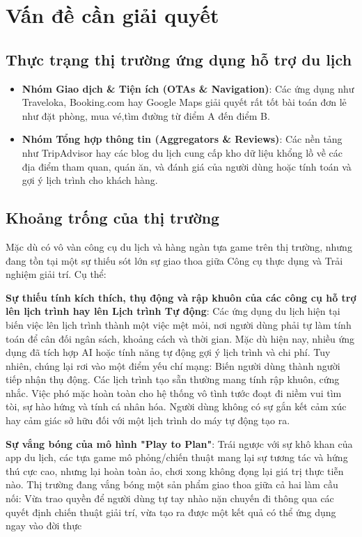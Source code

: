\newpage

\chapter{Vấn đề cần giải quyết}

\section{Thực trạng thị trường ứng dụng hỗ trợ du lịch}

\begin{itemize}[topsep=0pt, itemsep=2.5pt, leftmargin=1.5cm]
    \item \textbf{Nhóm Giao dịch \& Tiện ích (OTAs \& Navigation)}: Các ứng dụng như Traveloka, Booking.com hay Google Maps giải quyết rất tốt bài toán đơn lẻ như đặt phòng, mua vé,tìm đường từ điểm A đến điểm B.

    \item \textbf{Nhóm Tổng hợp thông tin (Aggregators \& Reviews)}: Các nền tảng như TripAdvisor hay các blog du lịch cung cấp kho dữ liệu khổng lồ về các địa điểm tham quan, quán ăn, và đánh giá của người dùng hoặc tính toán và gợi ý lịch trình cho khách hàng.
\end{itemize}

\section{Khoảng trống của thị trường}

Mặc dù có vô vàn công cụ du lịch và hàng ngàn tựa game trên thị trường, nhưng đang tồn tại một sự thiếu sót lớn sự giao thoa giữa Công cụ thực dụng và Trải nghiệm giải trí. Cụ thể:

\textbf{Sự thiếu tính kích thích, thụ động và rập khuôn của các công cụ hỗ trợ lên lịch trình hay lên Lịch trình Tự động}: Các ứng dụng du lịch hiện tại biến việc lên lịch trình thành một việc mệt mỏi, nơi người dùng phải tự làm tính toán để cân đối ngân sách, khoảng cách và thời gian. Mặc dù hiện nay, nhiều ứng dụng đã tích hợp AI hoặc tính năng tự động gợi ý lịch trình và chi phí. Tuy nhiên, chúng lại rơi vào một điểm yếu chí mạng: Biến người dùng thành người tiếp nhận thụ động. Các lịch trình tạo sẵn thường mang tính rập khuôn, cứng nhắc. Việc phó mặc hoàn toàn cho hệ thống vô tình tước đoạt đi niềm vui tìm tòi, sự hào hứng và tính cá nhân hóa. Người dùng không có sự gắn kết cảm xúc hay cảm giác sở hữu đối với một lịch trình do máy tự động tạo ra.

\textbf{Sự vắng bóng của mô hình "Play to Plan"}: Trái ngược với sự khô khan của app du lịch, các tựa game mô phỏng/chiến thuật mang lại sự tương tác và hứng thú cực cao, nhưng lại hoàn toàn ảo, chơi xong không đọng lại giá trị thực tiễn nào. Thị trường đang vắng bóng một sản phẩm giao thoa giữa cả hai làm cầu nối: Vừa trao quyền để người dùng tự tay nhào nặn chuyến đi thông qua các quyết định chiến thuật giải trí, vừa tạo ra được một kết quả có thể ứng dụng ngay vào đời thực


